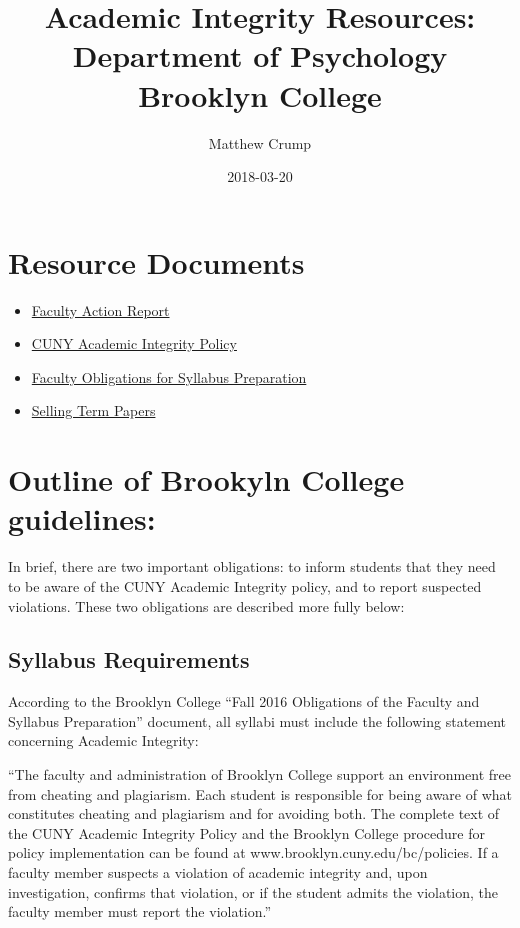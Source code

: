 \documentclass[]{book}
\title{Academic Integrity Resources: Department of Psychology Brooklyn College}
\author{Matthew Crump}
\date{2018-03-20}
\providecommand{\tightlist}{%
  \setlength{\itemsep}{0pt}\setlength{\parskip}{0pt}}
\theoremstyle{definition}
\theoremstyle{definition}
\theoremstyle{definition}
\theoremstyle{remark}
\begin{document}
\maketitle

{
\setcounter{tocdepth}{1}
\tableofcontents
}
\chapter*{Resource Documents}\label{resource-documents}

\begin{itemize}
\tightlist
\item
  \href{\%22Resources/Faculty\%20Action\%20Report.pdf\%22}{Faculty
  Action Report}
\item
  \href{\%22Resources/Academic_Integrity_Policy.pdf\%22}{CUNY Academic
  Integrity Policy}
\item
  \href{\%22Resources/F16_FacultyObligations_andSyllabus.pdf\%22}{Faculty
  Obligations for Syllabus Preparation}
\item
  \href{\%22Resources/110901_TermPapers_Sale.pdf\%22}{Selling Term
  Papers}
\end{itemize}

\chapter{Outline of Brookyln College
guidelines:}\label{outline-of-brookyln-college-guidelines}

In brief, there are two important obligations: to inform students that
they need to be aware of the CUNY Academic Integrity policy, and to
report suspected violations. These two obligations are described more
fully below:

\section{Syllabus Requirements}\label{syllabus-requirements}

According to the Brooklyn College ``Fall 2016 Obligations of the Faculty
and Syllabus Preparation'' document, all syllabi must include the
following statement concerning Academic Integrity:

``The faculty and administration of Brooklyn College support an
environment free from cheating and plagiarism. Each student is
responsible for being aware of what constitutes cheating and plagiarism
and for avoiding both. The complete text of the CUNY Academic Integrity
Policy and the Brooklyn College procedure for policy implementation can
be found at www.brooklyn.cuny.edu/bc/policies. If a faculty member
suspects a violation of academic integrity and, upon investigation,
confirms that violation, or if the student admits the violation, the
faculty member must report the violation.''
\end{document}
